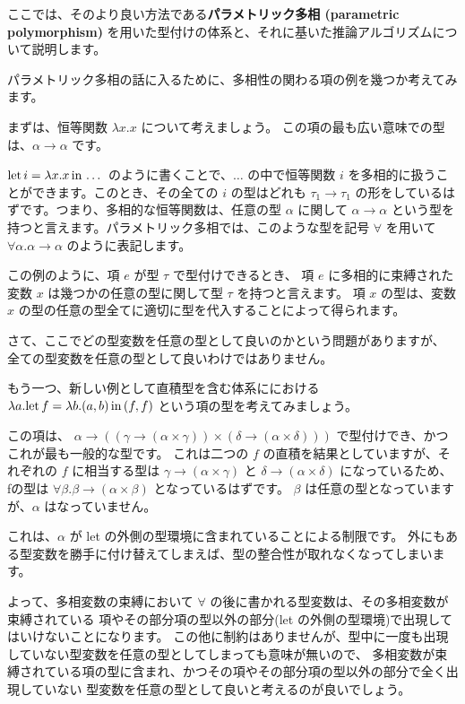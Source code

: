 ここでは、そのより良い方法である\textbf{パラメトリック多相 (parametric polymorphism)}
を用いた型付けの体系と、それに基いた推論アルゴリズムについて説明します。

パラメトリック多相の話に入るために、多相性の関わる項の例を幾つか考えてみます。

まずは、恒等関数 $\lambda x . x$ について考えましょう。
この項の最も広い意味での型は、$\alpha \to \alpha$ です。

$\mathrm{let} \, i = \lambda x . x \, \mathrm{in} \, \dots$ のように書くことで、$\dots$ の中で恒等関数 $i$
を多相的に扱うことができます。このとき、その全ての $i$ の型はどれも $\tau_1 \to \tau_1$
の形をしているはずです。つまり、多相的な恒等関数は、任意の型 $\alpha$ に関して $\alpha \to \alpha$
という型を持つと言えます。パラメトリック多相では、このような型を記号 $\forall$ を用いて
$\forall \alpha . \alpha \to \alpha$ のように表記します。

この例のように、項 $e$ が型 $\tau$ で型付けできるとき、
項 $e$ に多相的に束縛された変数 $x$ は幾つかの任意の型に関して型 $\tau$ を持つと言えます。
項 $x$ の型は、変数 $x$ の型の任意の型全てに適切に型を代入することによって得られます。

さて、ここでどの型変数を任意の型として良いのかという問題がありますが、
全ての型変数を任意の型として良いわけではありません。

もう一つ、新しい例として直積型を含む体系ににおける
$\lambda a . \mathrm{let} \, f = \lambda b . (a, b) \, \mathrm{in} \, (f, f)$ という項の型を考えてみましょう。

この項は、
$\alpha \to ((\gamma \to (\alpha \times \gamma)) \times (\delta \to (\alpha \times \delta)))$
で型付けでき、かつこれが最も一般的な型です。
これは二つの $f$ の直積を結果としていますが、それぞれの $f$ に相当する型は
$\gamma \to (\alpha \times \gamma)$ と $\delta \to (\alpha \times \delta)$ になっているため、
fの型は $\forall \beta . \beta \to (\alpha \times \beta)$ となっているはずです。
$\beta$ は任意の型となっていますが、$\alpha$ はなっていません。

これは、$\alpha$ が let の外側の型環境に含まれていることによる制限です。
外にもある型変数を勝手に付け替えてしまえば、型の整合性が取れなくなってしまいます。

よって、多相変数の束縛において $\forall$ の後に書かれる型変数は、その多相変数が束縛されている
項やその部分項の型以外の部分(let の外側の型環境)で出現してはいけないことになります。
この他に制約はありませんが、型中に一度も出現していない型変数を任意の型としてしまっても意味が無いので、
多相変数が束縛されている項の型に含まれ、かつその項やその部分項の型以外の部分で全く出現していない
型変数を任意の型として良いと考えるのが良いでしょう。

